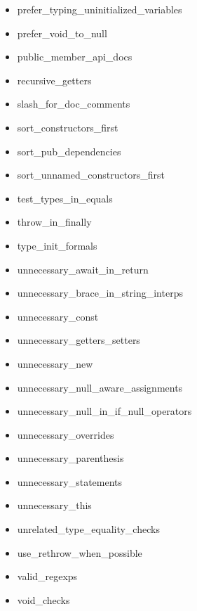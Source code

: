 \begin{itemize}
    \item prefer\_typing\_uninitialized\_variables
    \item prefer\_void\_to\_null
    \item public\_member\_api\_docs
    \item recursive\_getters
    \item slash\_for\_doc\_comments
    \item sort\_constructors\_first
    \item sort\_pub\_dependencies
    \item sort\_unnamed\_constructors\_first
    \item test\_types\_in\_equals
    \item throw\_in\_finally
    \item type\_init\_formals
    \item unnecessary\_await\_in\_return
    \item unnecessary\_brace\_in\_string\_interps
    \item unnecessary\_const
    \item unnecessary\_getters\_setters
    \item unnecessary\_new
    \item unnecessary\_null\_aware\_assignments
    \item unnecessary\_null\_in\_if\_null\_operators
    \item unnecessary\_overrides
    \item unnecessary\_parenthesis
    \item unnecessary\_statements
    \item unnecessary\_this
    \item unrelated\_type\_equality\_checks
    \item use\_rethrow\_when\_possible
    \item valid\_regexps
    \item void\_checks 
\end{itemize}
